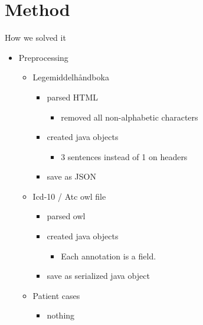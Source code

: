 \chapter{Method} \label{cha:}



How we solved it

\begin{itemize}
\item Preprocessing
	\begin{itemize}
	\item Legemiddelhåndboka
		\begin{itemize}
		\item parsed HTML
			\begin{itemize}
			\item removed all non-alphabetic characters
			\end{itemize}
		\item created java objects
			\begin{itemize}
			\item 3 sentences instead of 1 on headers
			\end{itemize}
		\item save as JSON
		\end{itemize}
	\item Icd-10 / Atc owl file
		\begin{itemize}
		\item parsed owl
		\item created java objects
			\begin{itemize}
			\item Each annotation is a field.
			\end{itemize}
		\item save as serialized java object
		\end{itemize}
	\item Patient cases
		\begin{itemize}
		\item nothing
		\end{itemize}
	\end{itemize}


\end{itemize}

